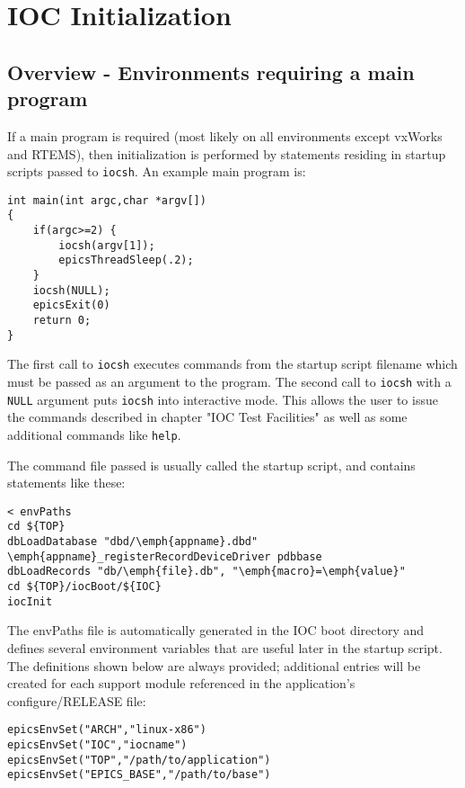 \chapter{IOC Initialization}

\section{Overview - Environments requiring a main program}

If a main program is required (most likely on all environments except vxWorks and RTEMS), then initialization is 
performed by statements residing in startup scripts passed to \verb|iocsh|. An example main program is:

\begin{verbatim}int main(int argc,char *argv[])
{
    if(argc>=2) {
        iocsh(argv[1]);
        epicsThreadSleep(.2);
    }
    iocsh(NULL);
    epicsExit(0)
    return 0;
}
\end{verbatim}The first call to \verb|iocsh| executes commands from the startup script filename which must be passed as an argument to the 
program. The second call to \verb|iocsh| with a \verb|NULL| argument puts \verb|iocsh| into interactive mode. This allows the user to 
issue the commands described in chapter "IOC Test Facilities" as well as some additional commands like \verb|help|.

The command file passed is usually called the startup script, and contains statements like these:

\begin{verbatim}< envPaths
cd ${TOP}
dbLoadDatabase "dbd/\emph{appname}.dbd"
\emph{appname}_registerRecordDeviceDriver pdbbase
dbLoadRecords "db/\emph{file}.db", "\emph{macro}=\emph{value}"
cd ${TOP}/iocBoot/${IOC}
iocInit
\end{verbatim}The envPaths file is automatically generated in the IOC boot directory and defines several environment variables that are 
useful later in the startup script. The definitions shown below are always provided; additional entries will be created for 
each support module referenced in the application's configure/RELEASE file:

\begin{verbatim}epicsEnvSet("ARCH","linux-x86")
epicsEnvSet("IOC","iocname")
epicsEnvSet("TOP","/path/to/application")
epicsEnvSet("EPICS_BASE","/path/to/base")
\end{verbatim}

